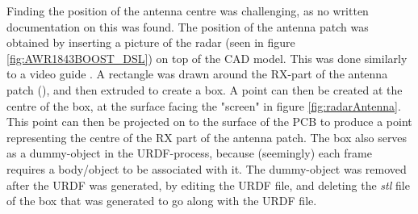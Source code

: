 Finding the position of the antenna centre was challenging, as no written documentation on this was found. The position of the antenna patch was obtained by inserting a picture of the radar (seen in figure \ref{fig:AWR1843BOOST_DSL}) on top of the CAD model. This was done similarly to a video guide \cite{reverseEngineeringSOLIDWORKS}. A rectangle was drawn around the RX-part of the antenna patch (\cite{xWR1843EvalModule}), and then extruded to create a box. A point can then be created at the centre of the box, at the surface facing the "screen" in figure \ref{fig:radarAntenna}. This point can then be projected on to the surface of the PCB to produce a point representing the centre of the RX part of the antenna patch. The box also serves as a dummy-object in the URDF-process, because (seemingly) each frame requires a body/object to be associated with it. The dummy-object was removed after the URDF was generated, by editing the URDF file, and deleting the \textit{stl} file of the box that was generated to go along with the URDF file. 


